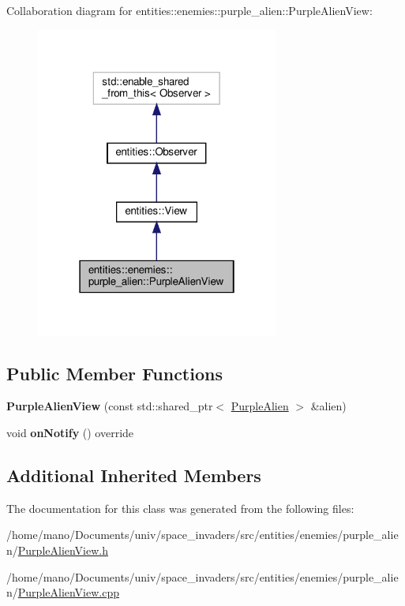 Collaboration diagram for entities\+:\+:enemies\+:\+:purple\+\_\+alien\+:\+:Purple\+Alien\+View\+:\nopagebreak
\begin{figure}[H]
\begin{center}
\leavevmode
\includegraphics[width=226pt]{classentities_1_1enemies_1_1purple__alien_1_1PurpleAlienView__coll__graph}
\end{center}
\end{figure}
\subsection*{Public Member Functions}
\begin{DoxyCompactItemize}
\item 
\mbox{\label{classentities_1_1enemies_1_1purple__alien_1_1PurpleAlienView_acb437c721aa9ee586ac8ce427a966cef}} 
{\bfseries Purple\+Alien\+View} (const std\+::shared\+\_\+ptr$<$ \hyperlink{classentities_1_1enemies_1_1purple__alien_1_1PurpleAlien}{Purple\+Alien} $>$ \&alien)
\item 
\mbox{\label{classentities_1_1enemies_1_1purple__alien_1_1PurpleAlienView_a1c0cd42fc59765b97724869601251590}} 
void {\bfseries on\+Notify} () override
\end{DoxyCompactItemize}
\subsection*{Additional Inherited Members}


The documentation for this class was generated from the following files\+:\begin{DoxyCompactItemize}
\item 
/home/mano/\+Documents/univ/space\+\_\+invaders/src/entities/enemies/purple\+\_\+alien/\hyperlink{PurpleAlienView_8h}{Purple\+Alien\+View.\+h}\item 
/home/mano/\+Documents/univ/space\+\_\+invaders/src/entities/enemies/purple\+\_\+alien/\hyperlink{PurpleAlienView_8cpp}{Purple\+Alien\+View.\+cpp}\end{DoxyCompactItemize}
